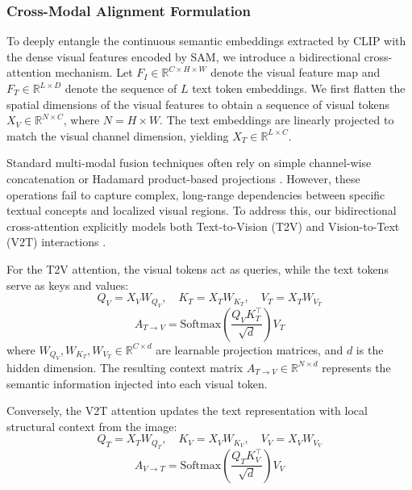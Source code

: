 \documentclass[onecolumn]{IEEEtran}
\numberwithin{equation}{section}
\theoremstyle{definition}
\theoremstyle{remark}
\begin{document}
\subsubsection{Cross-Modal Alignment Formulation}
To deeply entangle the continuous semantic embeddings extracted by CLIP with the dense visual features encoded by SAM, we introduce a bidirectional cross-attention mechanism. Let $F_I \in \mathbb{R}^{C \times H \times W}$ denote the visual feature map and $F_T \in \mathbb{R}^{L \times D}$ denote the sequence of $L$ text token embeddings. We first flatten the spatial dimensions of the visual features to obtain a sequence of visual tokens $X_V \in \mathbb{R}^{N \times C}$, where $N = H \times W$. The text embeddings are linearly projected to match the visual channel dimension, yielding $X_T \in \mathbb{R}^{L \times C}$.

Standard multi-modal fusion techniques often rely on simple channel-wise concatenation or Hadamard product-based projections \cite{lin2023multi}. However, these operations fail to capture complex, long-range dependencies between specific textual concepts and localized visual regions. To address this, our bidirectional cross-attention explicitly models both Text-to-Vision (T2V) and Vision-to-Text (V2T) interactions \cite{wang2024sam}.

For the T2V attention, the visual tokens act as queries, while the text tokens serve as keys and values:
\begin{equation}
    Q_V = X_V W_{Q_V}, \quad K_T = X_T W_{K_T}, \quad V_T = X_T W_{V_T}
\end{equation}
\begin{equation}
    A_{T \to V} = \text{Softmax}\left(\frac{Q_V K_T^\top}{\sqrt{d}}\right) V_T
\end{equation}
where $W_{Q_V}, W_{K_T}, W_{V_T} \in \mathbb{R}^{C \times d}$ are learnable projection matrices, and $d$ is the hidden dimension. The resulting context matrix $A_{T \to V} \in \mathbb{R}^{N \times d}$ represents the semantic information injected into each visual token.

Conversely, the V2T attention updates the text representation with local structural context from the image:
\begin{equation}
    Q_T = X_T W_{Q_T}, \quad K_V = X_V W_{K_V}, \quad V_V = X_V W_{V_V}
\end{equation}
\begin{equation}
    A_{V \to T} = \text{Softmax}\left(\frac{Q_T K_V^\top}{\sqrt{d}}\right) V_V
\end{equation}
\end{document}
